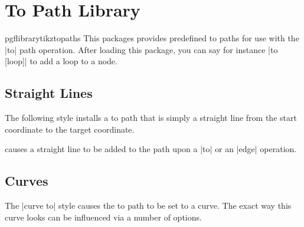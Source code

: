 %




\section{To Path Library}

\label{library-to-paths}

\begin{package}{pgflibrarytikztopaths}
  This packages provides predefined to paths for use with the |to|
  path operation. After loading this package, you can say for instance
  |to [loop]| to add a loop to a node. 
\end{package}


\subsection{Straight Lines}

The following style installs a to path that is simply a straight line
from the start coordinate to the target coordinate.

\begin{itemize}
  causes a straight line to be added to the path upon a |to| or an
  |edge| operation.
\begin{codeexample}[]
\end{codeexample}
\end{itemize}


\subsection{Curves}

The |curve to| style causes the to path to be set to a curve. The
exact way this curve looks can be influenced via a number of options.

